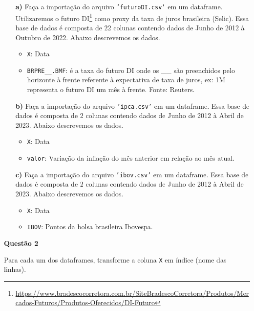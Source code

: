 \documentclass[12pt, a4paper]{article}
\begin{document}
\begin{itemize}
	\item[\textbf{a)}] Faça a importação do arquivo \texttt{'futuroDI.csv'} em um dataframe. Utilizaremos o futuro DI\footnote{\url{https://www.bradescocorretora.com.br/SiteBradescoCorretora/Produtos/Mercados-Futuros/Produtos-Oferecidos/DI-Futuro}} como proxy da taxa de juros brasileira (Selic). Essa base de dados é composta de 22 colunas contendo dados de Junho de 2012 à Outubro de 2022. Abaixo descrevemos os dados.
	
	\begin{itemize}
		\item \texttt{X}: Data
		\item \texttt{BRPRE\_\_.BMF}: é a taxa do futuro DI onde os \_\_ são preenchidos pelo horizonte à frente referente à expectativa de taxa de juros, ex: 1M representa o futuro DI um mês à frente. Fonte: Reuters.
	\end{itemize}



	\item[\textbf{b)}] Faça a importação do arquivo \texttt{'ipca.csv'} em um dataframe. Essa base de dados é composta de 2 colunas contendo dados de Junho de 2012 à Abril de 2023. Abaixo descrevemos os dados.
	
	\begin{itemize}
		\item \texttt{X}: Data
		\item \texttt{valor}: Variação da inflação do mês anterior em relação ao mês atual.
	\end{itemize}
	
	
	
	\item[\textbf{c)}] Faça a importação do arquivo \texttt{'ibov.csv'} em um dataframe. Essa base de dados é composta de 2 colunas contendo dados de Junho de 2012 à Abril de 2023. Abaixo descrevemos os dados.
	
	\begin{itemize}
		\item \texttt{X}: Data
		\item \texttt{IBOV}: Pontos da bolsa brasileira Ibovespa.
	\end{itemize}
	
	
	
\end{itemize}



\textbf{Questão 2}

Para cada um dos dataframes, transforme a coluna \texttt{X} em índice (nome das linhas).
\end{document}
